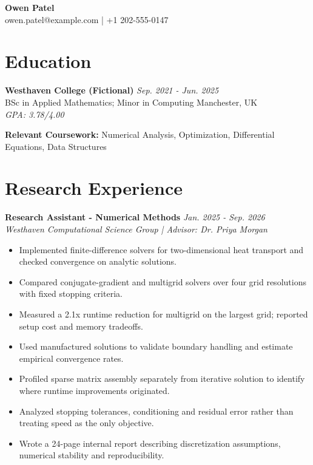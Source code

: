 \documentclass[11pt,a4paper]{article}
\begin{document}
\begin{center}
{\Huge\bfseries Owen Patel}\\[6pt]
{\small owen.patel@example.com \quad | \quad +1 202-555-0147}
\end{center}
\section{Education}
\textbf{Westhaven College (Fictional)} \hfill \textit{Sep. 2021 - Jun. 2025}\\
BSc in Applied Mathematics; Minor in Computing \hfill Manchester, UK\\
\textit{GPA: 3.78/4.00}

\textbf{Relevant Coursework:} Numerical Analysis, Optimization, Differential Equations, Data Structures
\vspace{4pt}

\section{Research Experience}
\textbf{Research Assistant - Numerical Methods} \hfill \textit{Jan. 2025 - Sep. 2026}\\
\textit{Westhaven Computational Science Group | Advisor: Dr. Priya Morgan}
\begin{itemize}[leftmargin=*,noitemsep,topsep=2pt]
\item Implemented finite-difference solvers for two-dimensional heat transport and checked convergence on analytic solutions.
\item Compared conjugate-gradient and multigrid solvers over four grid resolutions with fixed stopping criteria.
\item Measured a 2.1x runtime reduction for multigrid on the largest grid; reported setup cost and memory tradeoffs.
\item Used manufactured solutions to validate boundary handling and estimate empirical convergence rates.
\item Profiled sparse matrix assembly separately from iterative solution to identify where runtime improvements originated.
\item Analyzed stopping tolerances, conditioning and residual error rather than treating speed as the only objective.
\item Wrote a 24-page internal report describing discretization assumptions, numerical stability and reproducibility.
\end{itemize}
\end{document}

